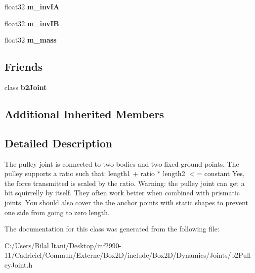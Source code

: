 \begin{DoxyCompactItemize}
\item 
float32 {\bfseries m\+\_\+inv\+IA}\hypertarget{classb2_pulley_joint_a701fbc685109f5b397b968be2407b123}{}\label{classb2_pulley_joint_a701fbc685109f5b397b968be2407b123}

\item 
float32 {\bfseries m\+\_\+inv\+IB}\hypertarget{classb2_pulley_joint_a19278e2f7dcec7275aff55b1d760b398}{}\label{classb2_pulley_joint_a19278e2f7dcec7275aff55b1d760b398}

\item 
float32 {\bfseries m\+\_\+mass}\hypertarget{classb2_pulley_joint_a60efdc42d9fd8f4c50f96eb68ff3f191}{}\label{classb2_pulley_joint_a60efdc42d9fd8f4c50f96eb68ff3f191}

\end{DoxyCompactItemize}
\subsection*{Friends}
\begin{DoxyCompactItemize}
\item 
class {\bfseries b2\+Joint}\hypertarget{classb2_pulley_joint_a54ade8ed3d794298108d7f4c4e4793fa}{}\label{classb2_pulley_joint_a54ade8ed3d794298108d7f4c4e4793fa}

\end{DoxyCompactItemize}
\subsection*{Additional Inherited Members}


\subsection{Detailed Description}
The pulley joint is connected to two bodies and two fixed ground points. The pulley supports a ratio such that\+: length1 + ratio $\ast$ length2 $<$= constant Yes, the force transmitted is scaled by the ratio. Warning\+: the pulley joint can get a bit squirrelly by itself. They often work better when combined with prismatic joints. You should also cover the the anchor points with static shapes to prevent one side from going to zero length. 

The documentation for this class was generated from the following file\+:\begin{DoxyCompactItemize}
\item 
C\+:/\+Users/\+Bilal Itani/\+Desktop/inf2990-\/11/\+Cadriciel/\+Commun/\+Externe/\+Box2\+D/include/\+Box2\+D/\+Dynamics/\+Joints/b2\+Pulley\+Joint.\+h\end{DoxyCompactItemize}
